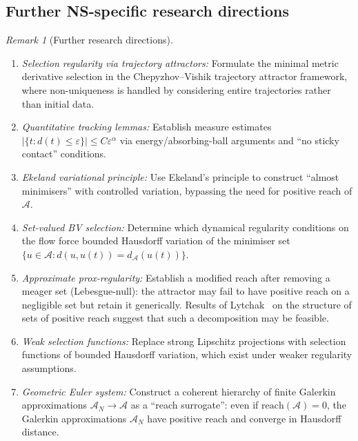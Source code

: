 \documentclass[12pt,a4paper]{article}
\theoremstyle{definition}
\theoremstyle{plain}
\theoremstyle{remark}
\newtheorem{remark}[definition]{Remark}
\begin{document}
\subsection{Further NS-specific research directions}

\begin{remark}[Further research directions]
\label{rem:further-ns-logdist}
\begin{enumerate}
\item \emph{Selection regularity via trajectory attractors:} Formulate the minimal metric derivative selection in the Chepyzhov--Vishik trajectory attractor framework, where non-uniqueness is handled by considering entire trajectories rather than initial data.
\item \emph{Quantitative tracking lemmas:} Establish measure estimates $|\{t : d(t) \leq \varepsilon\}| \leq C \varepsilon^\alpha$ via energy/absorbing-ball arguments and ``no sticky contact'' conditions.
\item \emph{Ekeland variational principle:} Use Ekeland's principle to construct ``almost minimisers'' with controlled variation, bypassing the need for positive reach of $\mathcal{A}$.
\item \emph{Set-valued BV selection:} Determine which dynamical regularity conditions on the flow force bounded Hausdorff variation of the minimiser set $\{u \in \mathcal{A} : d(u, u(t)) = d_{\mathcal{A}}(u(t))\}$.
\item \emph{Approximate prox-regularity:} Establish a modified reach after removing a meager set (Lebesgue-null): the attractor may fail to have positive reach on a negligible set but retain it generically. Results of Lytchak~\cite{Lytchak2024} on the structure of sets of positive reach suggest that such a decomposition may be feasible.
\item \emph{Weak selection functions:} Replace strong Lipschitz projections with selection functions of bounded Hausdorff variation, which exist under weaker regularity assumptions.
\item \emph{Geometric Euler system:} Construct a coherent hierarchy of finite Galerkin approximations $\mathcal{A}_N \to \mathcal{A}$ as a ``reach surrogate'': even if $\mathrm{reach}(\mathcal{A}) = 0$, the Galerkin approximations $\mathcal{A}_N$ have positive reach and converge in Hausdorff distance.
\end{enumerate}
\end{remark}
\end{document}
